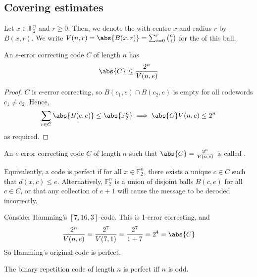 \subsection{Covering estimates}
\begin{definition}
    Let $x \in \mathbb F_2^n$ and $r \geq 0$.
    Then, we denote the  with centre $x$ and radius $r$ by $B(x,r)$.
    We write $V(n,r) = \abs{B(x,r)} = \sum_{i=0}^r \binom{n}{i}$ for the  of this ball.
\end{definition}
\begin{lemma}
    An $e$-error correcting code $C$ of length $n$ has
    \begin{align*}
        \abs{C} \leq \frac{2^n}{V(n,e)}
    \end{align*}
\end{lemma}
\begin{proof}
    $C$ is $e$-error correcting, so $B(c_1, e) \cap B(c_2, e)$ is empty for all codewords $c_1 \neq c_2$.
    Hence,
    \begin{align*}
        \sum_{c \in C} \abs{B(c,e)}  \leq \abs{\mathbb F_2^n} \implies \abs{C} V(n,e) \leq 2^n
    \end{align*}
    as required.
\end{proof}
\begin{definition}
    An $e$-error correcting code $C$ of length $n$ such that $\abs{C} = \frac{2^n}{V(n,e)}$ is called .
\end{definition}
\begin{remark}
    Equivalently, a code is perfect if for all $x \in \mathbb F_2^n$, there exists a unique $c \in C$ such that $d(x,c) \leq e$.
    Alternatively, $\mathbb F_2^n$ is a union of disjoint balls $B(c,e)$ for all $c \in C$, or that any collection of $e + 1$ will cause the message to be decoded incorrectly.
\end{remark}
\begin{example}
    Consider Hamming's $[7,16,3]$-code.
    This is 1-error correcting, and
    \begin{align*}
        \frac{2^n}{V(n,e)} = \frac{2^7}{V(7,1)} = \frac{2^7}{1+7} = 2^4 = \abs{C}
    \end{align*}
    So Hamming's original code is perfect.
\end{example}
\begin{example}
    The binary repetition code of length $n$ is perfect iff $n$ is odd.
\end{example}
